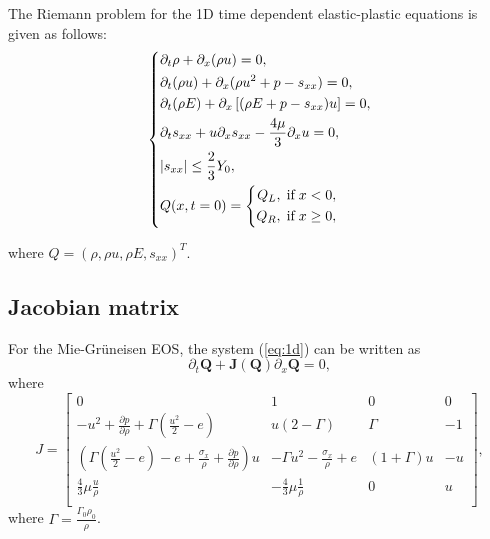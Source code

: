 \documentclass[review]{elsarticle}
\begin{document}
The Riemann problem for the 1D time dependent elastic-plastic equations is given as follows:
 \begin{equation}\label{eq:1d}
   \left\{ \begin{aligned}
       & \partial _t \rho +\partial_x(\rho u)=0,\\
       & \partial _t (\rho u)+\partial_x(\rho u^2 + p -s_{xx})=0,\\
       &\partial _t (\rho E)+\partial_x\left[(\rho E + p -s_{xx})u\right]=0,\\
       &\partial _t s_{xx}+u\partial_xs_{xx}-\frac{4\mu}{3}\partial_x u=0,\\
& |s_{xx}|\leq \frac{2}{3}Y_{0}, \\
       &Q(x,t = 0) = \left\{\begin{aligned}
           Q_L, \hspace{0.1cm} \text{if} \hspace{0.1cm} x<0, \\
           Q_R, \hspace{0.1cm} \text{if} \hspace{0.1cm} x\ge 0, \\
       \end{aligned}\right.
     \end{aligned}
  \right.
\end{equation}

where $Q = (\rho, \rho u, \rho E, s_{xx})^T$.

\subsection{Jacobian matrix} %
For the Mie-Gr\"uneisen EOS, the system (\ref{eq:1d}) can be written as
\begin{equation}
 \partial_t \mathbf{Q} +\mathbf{J}(\mathbf{{Q}})\partial_x\mathbf{Q} = 0,
\end{equation}
where
\begin{equation}\label{eq:Jcb}
  J = \left[\begin{array}{llll}
      0 & 1 & 0 & 0 \\
      -u^2 + \frac{\partial p}{\partial \rho} +\Gamma(\frac{u^2}{2}-e)& u(2-\Gamma)& \Gamma & -1 \\
      (\Gamma(\frac{u^2}{2}-e)-e+\frac{\sigma_x}{\rho}+\frac{\partial p}{\partial \rho})u & -\Gamma u^2 -\frac{\sigma_x}{\rho} +e & (1+\Gamma)u& -u\\
    \frac{4}{3}\mu\frac{u}{\rho} & -\frac{4}{3}\mu\frac{1}{\rho}& 0 & u \\
\end{array}
\right],
\end{equation}
where $\Gamma = \frac{\Gamma_0\rho_0}{\rho} $.
\end{document}
